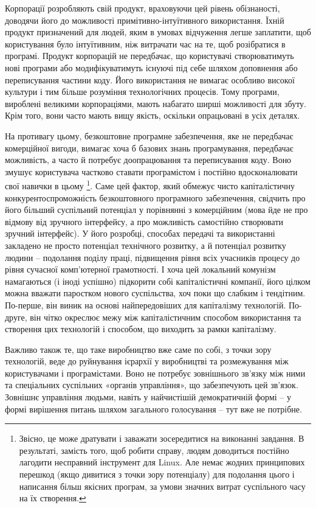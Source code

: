 \documentclass[../main]{subfiles}
\begin{document}
Корпорації розробляють свій продукт, враховуючи цей рівень обізнаності, доводячи його до можливості примітивно-інтуїтивного використання. Їхній продукт призначений для людей, яким в умовах відчуження легше заплатити, щоб користування було інтуїтивним, ніж витрачати час на те, щоб розібратися в програмі. Продукт корпорацій не передбачає, що користувачі створюватимуть нові програми або модифікуватимуть існуючі під себе шляхом доповнення або переписування частини коду. Його використання не вимагає особливо високої культури і тим більше розуміння технологічних процесів. Тому програми, вироблені великими корпораціями, мають набагато ширші можливості для збуту. Крім того, вони часто мають вищу якість, оскільки опрацьовані в усіх деталях.

На противагу цьому, безкоштовне програмне забезпечення, яке не передбачає комерційної вигоди, вимагає хоча б базових знань програмування, передбачає можливість, а часто й потребує доопрацювання та переписування коду. Воно змушує користувача частково ставати програмістом і постійно вдосконалювати свої навички в цьому \footnote{Звісно, це може дратувати і заважати зосередитися на виконанні завдання. В результаті, замість того, щоб робити справу, людям доводиться постійно лагодити несправний інструмент для Linux. Але немає жодних принципових перешкод (якщо дивитися з точки зору потенціалу) для подолання цього і написання більш якісних програм, за умови значних витрат суспільного часу на їх створення.}. Саме цей фактор, який обмежує чисто капіталістичну конкурентоспроможність безкоштовного програмного забезпечення, свідчить про його більший суспільний потенціал у порівнянні з комерційним (мова йде не про відмову від зручного інтерфейсу, а про можливість самостійно створювати зручний інтерфейс). У його розробці, способах передачі та використанні закладено не просто потенціал технічного розвитку, а й потенціал розвитку людини – подолання поділу праці, підвищення рівня всіх учасників процесу до рівня сучасної комп’ютерної грамотності. І хоча цей локальний комунізм намагаються (і іноді успішно) підкорити собі капіталістичні компанії, його цілком можна вважати паростком нового суспільства, хоч поки що слабким і тендітним. По-перше, він виник на основі найпередовіших для капіталізму технологій. По-друге, він чітко окреслює межу між капіталістичним способом використання та створення цих технологій і способом, що виходить за рамки капіталізму.

Важливо також те, що таке виробництво вже саме по собі, з точки зору технологій, веде до руйнування ієрархії у виробництві та розмежування між користувачами і програмістами. Воно не потребує зовнішнього зв’язку між ними та спеціальних суспільних «органів управління», що забезпечують цей зв’язок. Зовнішнє управління людьми, навіть у найчистішій демократичній формі – у формі вирішення питань шляхом загального голосування – тут вже не потрібне.
\end{document}
